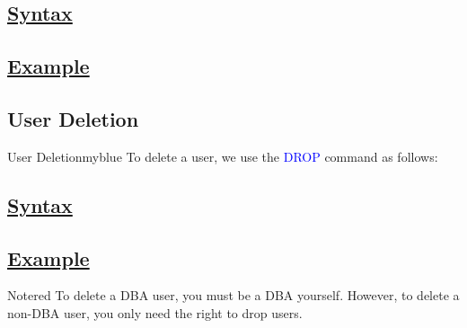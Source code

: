 \vspace{0.15cm}
\subsection*{\underline{Syntax}}



\vspace{0.15cm}

\subsection*{\underline{Example}}


\vspace{0.25cm}
\subsection{User Deletion} 
\begin{prettyBox}{User Deletion}{myblue}
To delete a user, we use the \textcolor{blue}{DROP} command as follows: 
\end{prettyBox}

\vspace{0.15cm}
\subsection*{\underline{Syntax}}


\vspace{0.15cm}
\subsection*{\underline{Example}}



\vspace{0.15cm}
\begin{prettyBox}{Note}{red}
To delete a DBA user, you must be a DBA yourself. However,
to delete a non-DBA user, you only need the right to drop users. 
\end{prettyBox}


\vspace{0.35cm}


